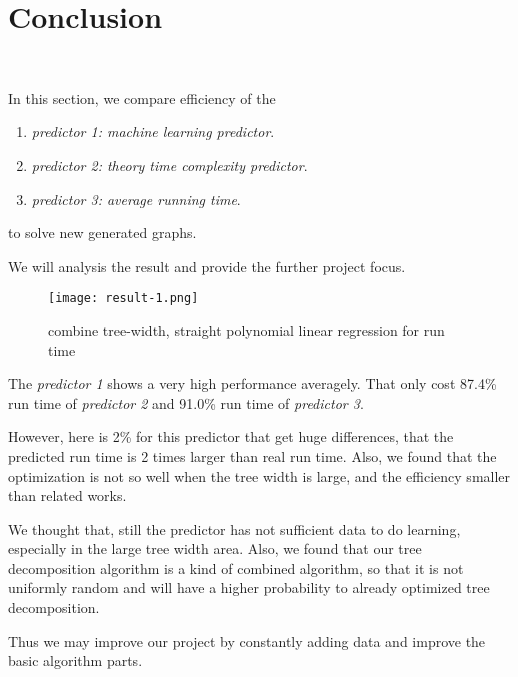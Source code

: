 \section{Conclusion}~\label{sec.Conclusion}

In this section, we compare efficiency of the
\begin{enumerate}
    \item \textit{predictor 1: machine learning predictor}.
    \item \textit{predictor 2: theory time complexity predictor}.
    \item \textit{predictor 3: average running time}.
\end{enumerate}
to solve new generated graphs.

We will analysis the result and provide the further project focus.

\begin{figure}[h!]
    \centering
    \texttt{[image: result-1.png]}
    \caption{combine tree-width, straight polynomial linear regression for run time}
    \label{combine tree-width, straight polynomial linear regression for run time}
    \end{figure}

The \textit{predictor 1} shows a very high performance averagely. That only cost 87.4\% run time of \textit{predictor 2} and 91.0\% run time of \textit{predictor 3}.

However, here is 2\% for this predictor that get huge differences, that the predicted run time is 2 times larger than real run time. Also, we found that the optimization is not so well when the tree width is large, and the efficiency smaller than related works.

We thought that, still the predictor has not sufficient data to do learning, especially in the large tree width area. Also, we found that our tree decomposition algorithm is a kind of combined algorithm, so that it is not uniformly random and will have a higher probability to already optimized tree decomposition.

Thus we may improve our project by constantly adding data and improve the basic algorithm parts.